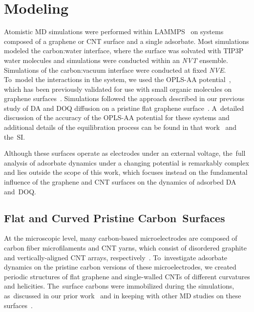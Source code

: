 \documentclass[molecules,article,accept,pdftex,moreauthors]{Definitions/mdpi}
\begin{document}
\section{Modeling}

Atomistic MD simulations were performed within LAMMPS~\cite{lammps} on systems composed of a graphene or CNT surface and a single adsorbate. Most simulations modeled the carbon:water interface, where the surface was solvated with TIP3P water molecules and simulations were conducted within an \textit{NVT} ensemble. Simulations of the carbon:vacuum interface were conducted at fixed \textit{NVE}. To~model the interactions in the system, we used the OPLS-AA potential~\cite{OPLS-AA}, which has been previously validated for use with small organic molecules on graphene surfaces~\cite{Lazar2013,Bjork2010}. Simulations followed the approach described in our previous study of DA and DOQ diffusion on a pristine flat graphene surface~\cite{Jia2022}. A~detailed discussion of the accuracy of the OPLS-AA potential for these systems and additional details of the equilibration process can be found in that work~\cite{Jia2022} and the~SI.

Although these surfaces operate as electrodes under an external voltage, the~full analysis of adsorbate dynamics under a changing potential is remarkably complex and lies outside the scope of this work, which focuses instead on the fundamental influence of the graphene and CNT surfaces on the dynamics of adsorbed DA and~DOQ. 




\subsection{Flat and Curved Pristine Carbon~Surfaces}
\label{sec:Methods_model_surfaces}

At the microscopic level, many carbon-based microelectrodes are composed of carbon fiber microfilaments and CNT yarns, which consist of disordered graphite and vertically-aligned CNT arrays, respectively~\cite{Yang2016, Yang2015}. To~investigate adsorbate dynamics on the pristine carbon versions of these microelectrodes, we created periodic structures of flat graphene and single-walled CNTs of different curvatures and helicities. The~surface carbons were immobilized during the simulations, as~discussed in our prior work~\cite{Jia2022} and in keeping with other MD studies on these surfaces~\cite{nanofluidics, Alexiadis2008,Falk2010, Lazar2013, Shu2001, Striolo2006, Zheng2012}.
\end{document}
